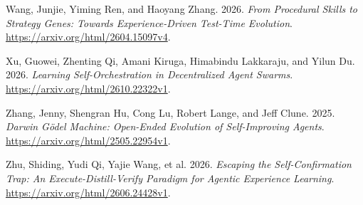 \documentclass[
  english,
  11pt,
]{article}
\newlength{\cslhangindent}
\newenvironment{CSLReferences}[2] %
 {\begin{list}{}{%
  \setlength{\itemindent}{0pt}
  \setlength{\leftmargin}{0pt}
  \setlength{\parsep}{0pt}
  \ifodd #1
   \setlength{\leftmargin}{\cslhangindent}
   \setlength{\itemindent}{-1\cslhangindent}
  \fi
  \setlength{\itemsep}{#2\baselineskip}}}
 {\end{list}}
\begin{document}
\begin{CSLReferences}{1}{1}
Wang, Junjie, Yiming Ren, and Haoyang Zhang. 2026. \emph{From Procedural
Skills to Strategy Genes: Towards Experience-Driven Test-Time
Evolution}. \url{https://arxiv.org/html/2604.15097v4}.

Xu, Guowei, Zhenting Qi, Amani Kiruga, Himabindu Lakkaraju, and Yilun
Du. 2026. \emph{Learning Self-Orchestration in Decentralized Agent
Swarms}. \url{https://arxiv.org/html/2610.22322v1}.

Zhang, Jenny, Shengran Hu, Cong Lu, Robert Lange, and Jeff Clune. 2025.
\emph{Darwin {Gödel} Machine: Open-Ended Evolution of Self-Improving
Agents}. \url{https://arxiv.org/html/2505.22954v1}.

Zhu, Shiding, Yudi Qi, Yajie Wang, et al. 2026. \emph{Escaping the
Self-Confirmation Trap: An Execute-Distill-Verify Paradigm for Agentic
Experience Learning}. \url{https://arxiv.org/html/2606.24428v1}.

\end{CSLReferences}
\end{document}
